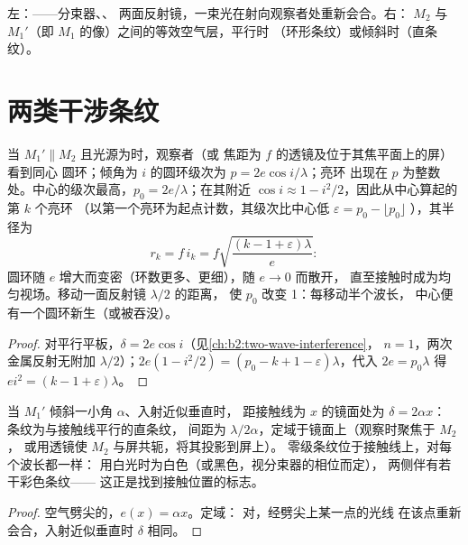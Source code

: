 \begin{omfigure}
{\small 左：——分束器、、
两面反射镜，一束光在射向观察者处重新会合。右：
$M_2$ 与 $M_1'$（即 $M_1$ 的像）之间的等效空气层，平行时
（环形条纹）或倾斜时（直条纹）。}
\end{omfigure}

\section{两类干涉条纹}

\begin{proposition}[空气平板的环]\label{prop:b2:michelson:rings}
当 $M_1' \parallel M_2$ 且光源为时，观察者（或
焦距为 $f$ 的透镜及位于其焦平面上的屏）看到同心
圆环；倾角为 $i$ 的圆环级次为 $p = 2e\cos i/\lambda$；亮环
出现在 $p$ 为整数处。中心的级次最高，$p_0 =
2e/\lambda$；在其附近 $\cos i \approx 1 - i^2/2$，因此从中心算起的第 $k$ 个亮环
（以第一个亮环为起点计数，其级次比中心低 $\varepsilon = p_0 - \lfloor p_0\rfloor$
），其半径为
\[
r_k = f\,i_k = f\sqrt{\frac{(k - 1 + \varepsilon)\lambda}e} :
\]
圆环随 $e$ 增大而变密（环数更多、更细），随 $e \to 0$ 而散开，
直至接触时成为均匀视场。移动一面反射镜 $\lambda/2$ 的距离，
使 $p_0$ 改变 1：每移动半个波长，
中心便有一个圆环新生（或被吞没）。
\end{proposition}

\begin{proof}
对平行平板，$\delta = 2e\cos i$（见\cref{ch:b2:two-wave-interference}，
$n = 1$，两次金属反射无附加 $\lambda/2$）；$2e(1 - i^2/2) =
(p_0 - k + 1 - \varepsilon)\lambda$，代入 $2e = p_0\lambda$ 得 $ei^2 = (k - 1 + \varepsilon)\lambda$。
\end{proof}

\begin{proposition}[空气劈尖的条纹]\label{prop:b2:michelson:wedge}
当 $M_1'$ 倾斜一小角 $\alpha$、入射近似垂直时，
距接触线为 $x$ 的镜面处为 $\delta = 2\alpha x$：
条纹为与接触线平行的直条纹，
间距为 $\lambda/2\alpha$，定域于镜面上（观察时聚焦于 $M_2$，
或用透镜使 $M_2$ 与屏共轭，将其投影到屏上）。
零级条纹位于接触线上，对每个波长都一样：
用白光时为白色（或黑色，视分束器的相位而定），
两侧伴有若干彩色条纹——
这正是找到接触位置的标志。
\end{proposition}

\begin{proof}
空气劈尖的，$e(x) = \alpha x$。定域：
对，经劈尖上某一点的光线
在该点重新会合，入射近似垂直时 $\delta$ 相同。
\end{proof}

